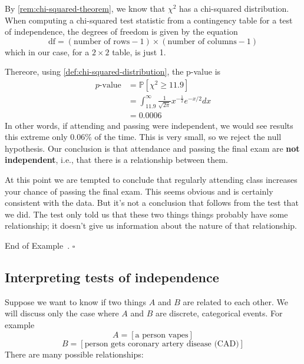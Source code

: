 \documentclass[10pt]{article}
\theoremstyle{definition}
\newtheorem{example}[theorem]{Example}
\renewenvironment{example}
{\begin{oldexample}}
  {\par\smallskip\hfill   End of Example~\theexample. $\square$    \par\end{oldexample}}
\newcommand{\1}[1]{\textbf{1}_{\left[#1\right]}} %
\def\P{\mathbb{P}} %
\begin{document}
\begin{example}[Test of independence]
  By \cref{rem:chi-squared-theorem}, we know that $\chi^{2}$ has a chi-squared
  distribution. When computing a chi-squared test statistic from a contingency
  table for a test of independence, the degrees of freedom is given by the
  equation
  \begin{equation*}
    \text{df}=(\text{number of rows} -1)\times (\text{number of columns} -1)
  \end{equation*}
  which in our case, for a $2\times 2$ table, is just 1.

  Thereore, using \cref{def:chi-squared-distribution}, the p-value is
  \begin{align*}
    p \text{-value}
    &= \P\left[\chi^{2}\geq 11.9\right]\\
    &= \int_{11.9}^{\infty} \frac{1}{\sqrt{2\pi}} x^{-\frac{1}{2}}e^{-x/2}dx\\
    &=0.0006
  \end{align*}
  In other words, if attending and passing were independent, we would see
  results this extreme only 0.06\% of the time. This is very small, so we reject
  the null hypothesis. Our conclusion is that attendance and passing the final
  exam are \textbf{not independent}, i.e., that there is a relationship between
  them.

  At this point we are tempted to conclude that regularly attending class
  increases your chance of passing the final exam. This seems obvious and is
  certainly consistent with the data. But it's not a conclusion that follows
  from the test that we did. The test only told us that these two things things
  probably have some relationship; it doesn't give us information about the
  nature of that relationship.
\end{example}


\subsection{Interpreting tests of independence}

Suppose we want to know if two things $A$ and $B$ are related to each other.
We will discuss only the case where $A$ and $B$ are discrete, categorical
events. For example
\begin{equation*}
  A  = \left[ \text{a person vapes} \right] 
\end{equation*}
\begin{equation*}
  B = \left[ \text{person gets coronary artery disease (CAD)} \right] 
\end{equation*}
There are many possible relationships:
\end{document}
